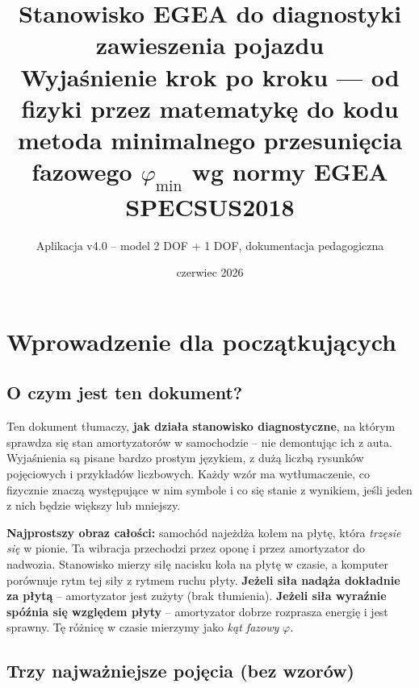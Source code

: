 \documentclass[11pt,a4paper]{article}
\title{\textbf{Stanowisko EGEA do diagnostyki zawieszenia pojazdu}\\[0.4em]
  \large Wyjaśnienie krok po kroku --- od fizyki przez matematykę do kodu \\
  metoda minimalnego przesunięcia fazowego $\varphi_{\min}$ wg normy EGEA SPECSUS2018}
\author{Aplikacja v4.0 -- model 2 DOF + 1 DOF, dokumentacja pedagogiczna}
\date{czerwiec 2026}
\theoremstyle{plainpol}
\begin{document}

\maketitle
\tableofcontents
\clearpage

\section{Wprowadzenie dla początkujących}

\subsection{O czym jest ten dokument?}

Ten dokument tłumaczy, \textbf{jak działa stanowisko diagnostyczne}, na którym
sprawdza się stan amortyzatorów w samochodzie -- nie demontując ich z auta.
Wyjaśnienia są pisane bardzo prostym językiem, z dużą liczbą rysunków
pojęciowych i przykładów liczbowych. Każdy wzór ma wytłumaczenie, co
fizycznie znaczą występujące w nim symbole i co się stanie z wynikiem,
jeśli jeden z nich będzie większy lub mniejszy.

\begin{intuicja}
\textbf{Najprostszy obraz całości:} samochód najeżdża kołem na płytę, która
\emph{trzęsie się} w pionie. Ta wibracja przechodzi przez oponę i przez
amortyzator do nadwozia. Stanowisko mierzy siłę nacisku koła na płytę
w czasie, a komputer porównuje rytm tej siły z rytmem ruchu płyty.
\textbf{Jeżeli siła nadąża dokładnie za płytą} -- amortyzator jest zużyty
(brak tłumienia). \textbf{Jeżeli siła wyraźnie spóźnia się względem
płyty} -- amortyzator dobrze rozprasza energię i jest sprawny. Tę różnicę
w czasie mierzymy jako \emph{kąt fazowy} $\varphi$.
\end{intuicja}

\subsection{Trzy najważniejsze pojęcia (bez wzorów)}
\end{document}
